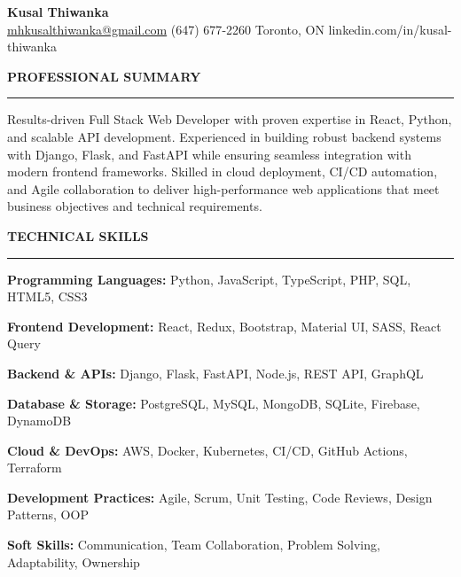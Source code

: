 \documentclass[10pt,letterpaper]{article}
\begin{document}
\begin{center}
{\LARGE\textbf{Kusal Thiwanka}}\\[3pt]
\href{mailto:mhkusalthiwanka@gmail.com}{mhkusalthiwanka@gmail.com}\hspace{2em}%
(647) 677{-}2260\hspace{2em}%
Toronto, ON\hspace{2em}
linkedin.com/in/kusal-thiwanka
\end{center}

\vspace{6pt}

\textbf{PROFESSIONAL SUMMARY}\\[-8pt]
\noindent\rule{\textwidth}{1pt}

\vspace{-2pt}

Results-driven Full Stack Web Developer with proven expertise in React, Python, and scalable API development. Experienced in building robust backend systems with Django, Flask, and FastAPI while ensuring seamless integration with modern frontend frameworks. Skilled in cloud deployment, CI/CD automation, and Agile collaboration to deliver high-performance web applications that meet business objectives and technical requirements.

\vspace{8pt}

\textbf{TECHNICAL SKILLS}\\[-8pt]
\noindent\rule{\textwidth}{1pt}

\vspace{-2pt}

\textbf{Programming Languages:} Python, JavaScript, TypeScript, PHP, SQL, HTML5, CSS3

\textbf{Frontend Development:} React, Redux, Bootstrap, Material UI, SASS, React Query

\textbf{Backend \& APIs:} Django, Flask, FastAPI, Node.js, REST API, GraphQL

\textbf{Database \& Storage:} PostgreSQL, MySQL, MongoDB, SQLite, Firebase, DynamoDB

\textbf{Cloud \& DevOps:} AWS, Docker, Kubernetes, CI/CD, GitHub Actions, Terraform

\textbf{Development Practices:} Agile, Scrum, Unit Testing, Code Reviews, Design Patterns, OOP

\textbf{Soft Skills:} Communication, Team Collaboration, Problem Solving, Adaptability, Ownership

\vspace{8pt}
\end{document}
